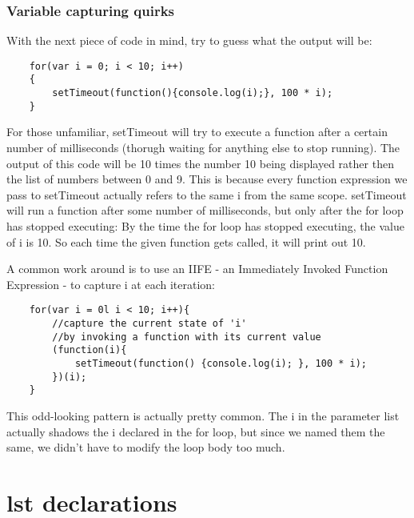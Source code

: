 \subsubsection{Variable capturing quirks}
With the next piece of code in mind, try to guess what the output will be:
\begin{lstlisting}
    for(var i = 0; i < 10; i++)
    {
        setTimeout(function(){console.log(i);}, 100 * i);
    }
\end{lstlisting}

For those unfamiliar, setTimeout will try to execute a function after a certain number of milliseconds (thorugh waiting for anything else to stop running). The output of this code will be 10 times the number 10 being displayed rather then the list of numbers between 0 and 9. This is because every function expression we pass to setTimeout actually refers to the same i from the same scope. setTimeout will run a function after some number of milliseconds, but only after the for loop has stopped executing: By the time the for loop has stopped executing, the value of i is 10. So each time the given function gets called, it will print out 10.

A common work around is to use an IIFE - an Immediately Invoked Function Expression - to capture i at each iteration:
\begin{lstlisting}
    for(var i = 0l i < 10; i++){
        //capture the current state of 'i'
        //by invoking a function with its current value
        (function(i){
            setTimeout(function() {console.log(i); }, 100 * i);
        })(i);
    }
\end{lstlisting}

This odd-looking pattern is actually pretty common. The i in the parameter list actually shadows the i declared in the for loop, but since we named them the same, we didn't have to modify the loop body too much.

\section{lst declarations}